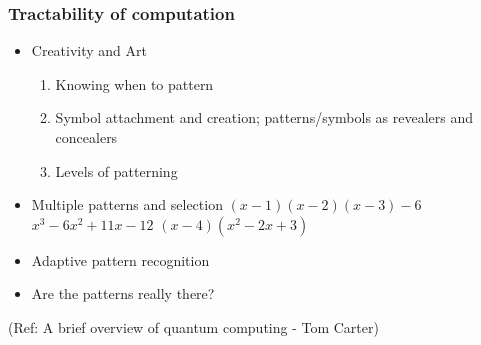  \begin{frame}[fragile]\frametitle{Tractability of computation}

\begin{itemize}
	\item Creativity and Art
	\begin{enumerate}
		\item Knowing when to pattern
		\item Symbol attachment and creation; \newline 
			patterns/symbols as revealers and \newline
			concealers
		\item Levels of patterning
	\end{enumerate}
	\item Multiple patterns and selection \newline
		$ (x - 1)(x - 2)(x - 3) - 6 $ \newline
		$ x^3 - 6x^2 + 11x - 12 $ \newline
		$ (x - 4)(x^2 - 2x + 3) $
	\item Adaptive pattern recognition
	\item Are the patterns really there?
\end{itemize}

\tiny{(Ref: A brief overview of quantum computing - Tom Carter)}

\end{frame}

